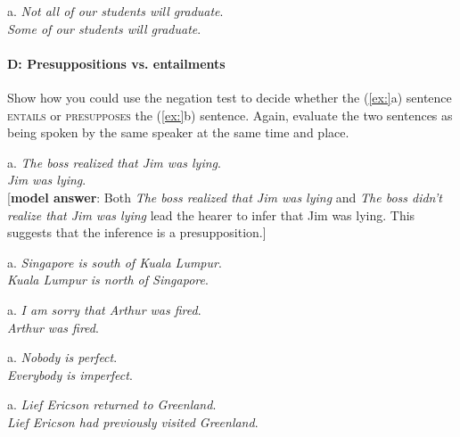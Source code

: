 \begin{stylepoints}
\ea%
    \label{ex:key:4}




          a. \textit{Not all of our students will graduate}.\\
\ex \textit{Some of our students will graduate}.
    \z
\end{stylepoints}

\paragraph{D: Presuppositions vs. entailments}

Show how you could use the negation test to decide whether the (\ref{ex:}a) sentence \textsc{entails} or \textsc{presupposes} the (\ref{ex:}b) sentence. Again, evaluate the two sentences as being spoken by the same speaker at the same time and place.

\begin{stylepoints}
\ea%
    \label{ex:key:1}




          a. \textit{The boss realized that Jim was lying}.\\
\ex \textit{Jim was lying}.\\
{}[\textbf{model answer}: Both \textit{The boss realized that Jim was lying} and \textit{The boss didn’t realize that Jim was lying} lead the hearer to infer that Jim was lying. This suggests that the inference is a presupposition.]
    \z
\end{stylepoints}

\begin{stylepoints}
\ea%
    \label{ex:key:2}




          a. \textit{Singapore is south of Kuala Lumpur}.\\
\ex \textit{Kuala Lumpur is north of Singapore}.
    \z
\end{stylepoints}

\begin{stylepoints}
\ea%
    \label{ex:key:3}




          a. \textit{I am sorry that Arthur was fired}.\\
\ex \textit{Arthur was fired}.
    \z
\end{stylepoints}

\begin{stylepoints}
\ea%
    \label{ex:key:4}




          a. \textit{Nobody is perfect}.\\
\ex \textit{Everybody is imperfect}.
    \z
\end{stylepoints}

\begin{stylepoints}
\ea%
    \label{ex:key:5}




          a. \textit{Lief Ericson returned to Greenland}.\\
\ex \textit{Lief Ericson had previously visited Greenland}.
    \z
\end{stylepoints}

